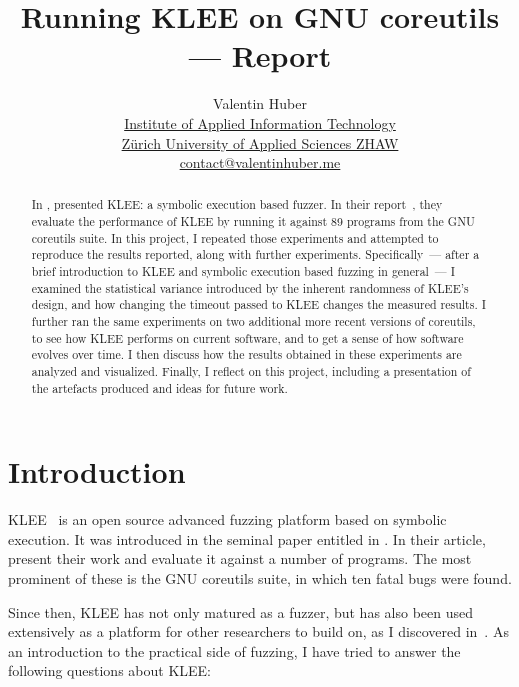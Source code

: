 \documentclass{article}
\title{%
    \vspace{50px}%
    \Huge Running KLEE on GNU coreutils\break%
    —\break%
    Report%
    \vspace{250px}%
}
\author{%
    \large Valentin Huber\vspace{5px}\\%
    \normalsize\href{https://www.zhaw.ch/en/engineering/institutes-centres/init/}{Institute of Applied Information Technology}\\%
    \normalsize\href{https://www.zhaw.ch/en}{Zürich University of Applied Sciences ZHAW}\\%
    \normalsize\href{mailto://contact@valentinhuber.me}{contact@valentinhuber.me}%
    \vspace{50px}
}
\let\savedCite=\cite
\renewcommand{\cite}{\unskip~\savedCite}
\begin{document}
\maketitle

\clearpage\newpage
\begin{center}
    \begin{minipage}{0.8\textwidth}
        \vspace{70px}
        \begin{abstract}
            In \citeyear{KLEE}, \citeauthor{KLEE} presented KLEE: a symbolic execution based fuzzer. In their report\cite{KLEE}, they evaluate the performance of KLEE by running it against 89 programs from the GNU coreutils suite. In this project, I repeated those experiments and attempted to reproduce the results reported, along with further experiments. Specifically~— after a brief introduction to KLEE and symbolic execution based fuzzing in general~— I examined the statistical variance introduced by the inherent randomness of KLEE's design, and how changing the timeout passed to KLEE changes the measured results. I further ran the same experiments on two additional more recent versions of coreutils, to see how KLEE performs on current software, and to get a sense of how software evolves over time. I then discuss how the results obtained in these experiments are analyzed and visualized. Finally, I reflect on this project, including a presentation of the artefacts produced and ideas for future work.
        \end{abstract}
    \end{minipage}
\end{center}

\clearpage\newpage
\tableofcontents
\clearpage\newpage
{}

\section{Introduction}
\label{Introduction}
KLEE\cite{KLEEWebsite} is an open source advanced fuzzing platform based on symbolic execution. It was introduced in the seminal paper entitled  in \citeyear{KLEE}. In their article, \citeauthor{KLEE} present their work and evaluate it against a number of programs. The most prominent of these is the GNU coreutils suite, in which ten fatal bugs were found.

Since then, KLEE has not only matured as a fuzzer, but has also been used extensively as a platform for other researchers to build on, as I discovered in\cite{EVA}. As an introduction to the practical side of fuzzing, I have tried to answer the following questions about KLEE:
\end{document}
